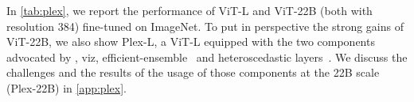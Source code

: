 
In \cref{tab:plex}, we report the performance of ViT-L and ViT-22B (both with resolution 384) fine-tuned on ImageNet. 
To put in perspective the strong gains of ViT-22B, we also show Plex-L, a ViT-L equipped with the two components advocated by \citet{tran2022plex}, viz, efficient-ensemble~\citep{wen2019batchensemble} and heteroscedastic layers~\citep{collier2021correlated}.
We discuss the challenges and the results of the usage of those components at the 22B scale (Plex-22B) in \cref{app:plex}.


\begin{table}[t]
    \caption{ViT-22B evaluated on some representative metrics from the Plex reliability benchmark~\citep{tran2022plex}$^*$.}
\centering
  \setlength{\tabcolsep}{4pt}
    \label{tab:plex}
\end{table}


